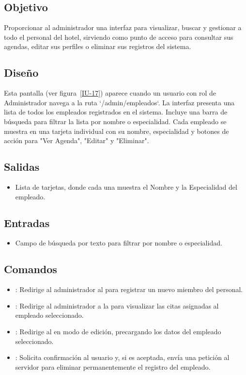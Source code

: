 \subsection{Objetivo}
    Proporcionar al administrador una interfaz para visualizar, buscar y gestionar a todo el personal del hotel, sirviendo como punto de acceso para consultar sus agendas, editar sus perfiles o eliminar sus registros del sistema.

\subsection{Diseño}
    Esta pantalla  (ver figura~\ref{IU-17}) aparece cuando un usuario con rol de Administrador navega a la ruta `/admin/empleados`. La interfaz presenta una lista de todos los empleados registrados en el sistema. Incluye una barra de búsqueda para filtrar la lista por nombre o especialidad. Cada empleado se muestra en una tarjeta individual con su nombre, especialidad y botones de acción para "Ver Agenda", "Editar" y "Eliminar".


\subsection{Salidas}
\begin{itemize}
    \item Lista de tarjetas, donde cada una muestra el Nombre y la Especialidad del empleado.
\end{itemize}

\subsection{Entradas}
\begin{itemize}
    \item Campo de búsqueda por texto para filtrar por nombre o especialidad.
\end{itemize}

\subsection{Comandos}
\begin{itemize}
    \item {}: Redirige al administrador al  para registrar un nuevo miembro del personal.
    \item {}: Redirige al administrador a la  para visualizar las citas asignadas al empleado seleccionado.
    \item {}: Redirige al  en modo de edición, precargando los datos del empleado seleccionado.
    \item {}: Solicita confirmación al usuario y, si es aceptada, envía una petición al servidor para eliminar permanentemente el registro del empleado.
\end{itemize}

